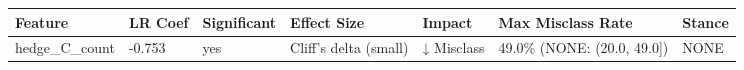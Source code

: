 \begin{tabular}{lllllll}
\toprule
Feature & LR Coef & Significant & Effect Size & Impact & Max Misclass Rate & Stance \\
\midrule
hedge\_C\_count & -0.753 & yes & Cliff's delta (small) & ↓ Misclass & 49.0\% (NONE: (20.0, 49.0]) & NONE \\
\bottomrule
\end{tabular}
